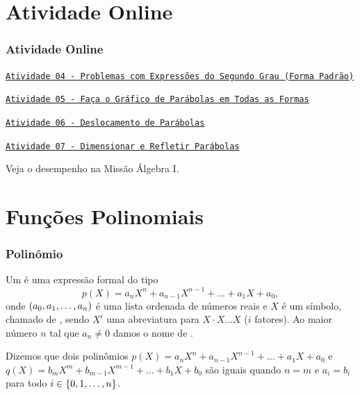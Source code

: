 \documentclass[brazil, notheorems, 10pt]{beamer}
\begin{document}
\section{Atividade Online}
\begin{frame}
\frametitle{Atividade Online} %

\href{https://pt.khanacademy.org/math/algebra-home/alg-quadratics/quad-standard-form-alg/e/key-features-quadratics}
{{\tt Atividade 04 - Problemas com Expressões do Segundo Grau (Forma
Padrão)}}

\href{https://pt.khanacademy.org/math/algebra-home/alg-quadratics/alg-features-of-quadratic-functions/e/graphing_parabolas_2}
{{\tt Atividade 05 - Faça o Gráfico de Parábolas em Todas as
Formas}}

\href{https://pt.khanacademy.org/math/algebra-home/alg-quadratics/alg-transforming-quadratic-functions/e/shift-parabolas}
{{\tt Atividade 06 - Deslocamento de Parábolas}}

\href{https://pt.khanacademy.org/math/algebra-home/alg-quadratics/alg-transforming-quadratic-functions/e/stretch-and-shrink-parabolas}
{{\tt Atividade 07 - Dimensionar e Refletir Parábolas}}

Veja o desempenho na Missão Álgebra I.


\end{frame}



\section{Funções Polinomiais}
\begin{frame}
\frametitle{Polinômio} %

\begin{Def}
Um  é uma expressão formal do tipo
$$p(X) = a_n X^n+ a_{n-1} X^{n-1} + \dots + a_1X + a_0,$$
onde $\left(a_0, a_1 , \dots , a_n\right)$ é uma lista ordenada de
números reais e $X$ é um símbolo, chamado de ,
sendo $X^i$ uma abreviatura para $X\cdot X  \dots  X$ ($i$ fatores).
Ao maior número $n$ tal que $a_n \neq 0$ damos o nome de .
\end{Def}\pause

Dizemos que dois polinômios $p(X) = a_n X^n+ a_{n-1} X^{n-1} + \dots
+ a_1X + a_0$ e $q(X) = b_m X^m + b_{m-1} X^{m-1} + \dots + b_1X +
b_0$ são iguais quando $n=m$ e $a_i = b_i$ para todo $i \in \left\{0,
1, \dots , n\right\}$.

\end{frame}
\end{document}
